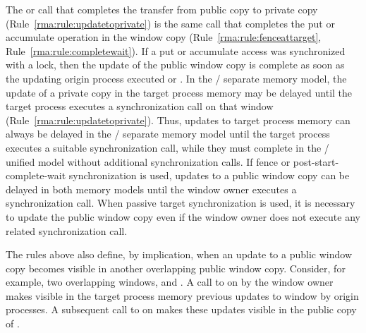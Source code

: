 The  or  call that
completes the transfer from public copy to private copy
(Rule~\ref{rma:rule:updatetoprivate}) is the same call that completes the put
or accumulate operation in the window copy
(Rule~\ref{rma:rule:fenceattarget}, Rule~\ref{rma:rule:completewait}).  If a put
or accumulate access was synchronized with a lock, then the update of
the public window copy is complete as soon as the updating origin process
executed  or
.  In the
\RMA/ separate memory model, the update of a
private copy in the target process 
memory may be delayed until the target process executes a
synchronization call on that window (Rule~\ref{rma:rule:updatetoprivate}).
Thus, updates to target process memory can always be delayed in the \RMA/
separate memory model until the target process executes a suitable
synchronization call, while they must complete in the \RMA/ unified
model without additional synchronization calls.  
%
If fence or
post-start-complete-wait synchronization is used, updates to a public
window copy can be delayed in both memory models until the window owner
executes a synchronization call.
When passive target 
synchronization
is used, it is necessary to update the public window
copy
even if the window owner does not execute any related
synchronization call.

The rules above also define, by implication, when an update to a
public window copy becomes visible in another overlapping public
window copy.
Consider, for example,  two overlapping windows,  and .  A call to
 on  by the window owner
makes visible in the target process memory
previous updates to window  by origin processes.  A subsequent call
to  on  makes these updates visible in
the public copy of .

